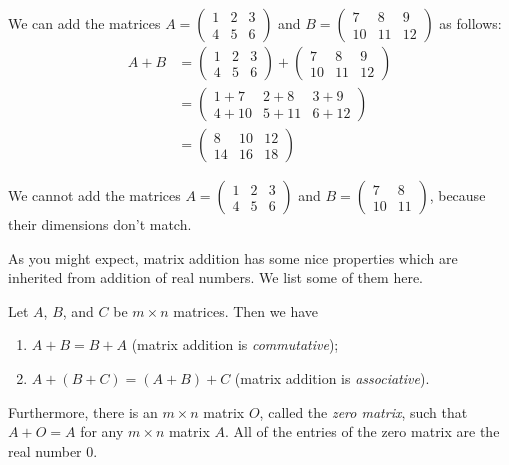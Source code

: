 \documentclass{ximera}
\begin{document}
\begin{example}
We can add the matrices $A = \left(\begin{array}{ccc}1&2&3\\4&5&6\end{array}\right)$ and $B=\left(\begin{array}{ccc}7&8&9\\10&11&12\end{array}\right)$ as follows:
\begin{align*}
A+B &= \left(\begin{array}{ccc}1&2&3\\4&5&6\end{array}\right) + \left(\begin{array}{ccc}7&8&9\\10&11&12\end{array}\right)\\
&= \left(\begin{array}{ccc}1+7&2+8&3+9\\4+10&5+11&6+12\end{array}\right)\\
&= \left(\begin{array}{ccc}8&10&12\\14&16&18\end{array}\right)
\end{align*}
\end{example}

\begin{example}
We cannot add the matrices $A = \left(\begin{array}{ccc}1&2&3\\4&5&6\end{array}\right)$ and $B=\left(\begin{array}{cc}7&8\\10&11\end{array}\right)$, because their dimensions don't match.
\end{example}

As you might expect, matrix addition has some nice properties which are inherited from addition of real numbers. We list some of them here.

\begin{proposition}
Let $A$, $B$, and $C$ be $m\times n$ matrices. Then we have
\begin{enumerate}
\item $A+B = B+A$ (matrix addition is \emph{commutative});
\item $A+(B+C)=(A+B)+C$ (matrix addition is \emph{associative}).
\end{enumerate}
Furthermore, there is an $m\times n$ matrix $O$, called the \emph{zero matrix}, such that $A+O = A$ for any $m\times n$ matrix $A$. All of the entries of the zero matrix are the real number $0$.
\end{proposition}
\end{document}
